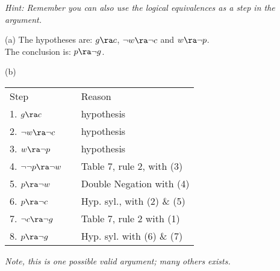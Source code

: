 \begin{questions}

\textit{Hint: Remember you can also use the logical equivalences as a step in the argument.}
    \ifprintanswers
        \vspace{-12pt}
    \fi
\begin{solution}
  (a) The hypotheses are: $g \ra c$, $\neg w \ra \neg c$ and $w \ra \neg p$. \\
  The conclusion is: $p \ra \neg g$.
  
  (b)

    \begin{tabular}{lll}
        Step    & \hspace{0.2in} & Reason \\
        1. $g \ra c$                & & hypothesis \\
        2. $\neg w \ra \neg c$          & & hypothesis \\
        3. $w \ra \neg p$             & & hypothesis \\
        4. $\neg \neg p \ra \neg w$   & & Table 7, rule 2, with (3) \\
        5. $p \ra \neg w$       & & Double Negation with (4) \\
        6. $p \ra \neg c$               & & Hyp. syl., with (2) \& (5) \\
        7. $\neg c \ra \neg g$          & & Table 7, rule 2 with (1) \\
        8. $p \ra \neg g$       & & Hyp. syl. with (6) \& (7)
    \end{tabular}
    
    \emph{Note, this is one possible valid argument; many others exists.}
\end{solution}





\end{questions}
